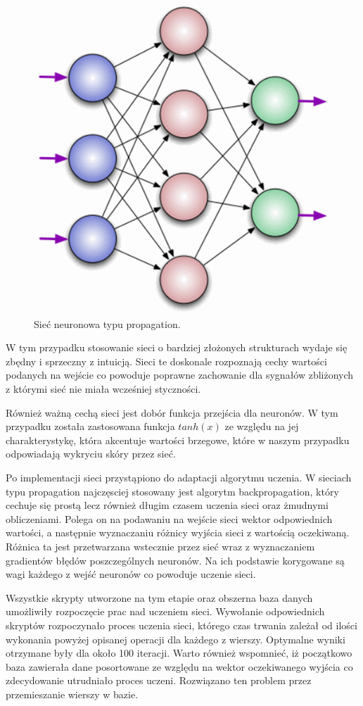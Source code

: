 \begin{figure}[tbph!]
	\centering
	\includegraphics[width=0.7\linewidth]{images/nn.png}
	\caption{Sieć neuronowa typu propagation.}
	\label{fig:nn}
\end{figure} 

W tym przypadku stosowanie sieci o bardziej złożonych strukturach wydaje się zbędny i sprzeczny z intuicją. Sieci te doskonale rozpoznają cechy wartości podanych na wejście co powoduje poprawne zachowanie dla sygnałów zbliżonych z którymi sieć nie miała wcześniej styczności. 

Również ważną cechą sieci jest dobór funkcja przejścia dla neuronów. W tym przypadku została zastosowana funkcja $tanh(x)$ ze względu na jej charakterystykę, która akcentuje wartości brzegowe, które w naszym przypadku odpowiadają wykryciu skóry przez sieć. 

Po implementacji sieci przystąpiono do adaptacji algorytmu uczenia. W sieciach typu propagation najczęsciej stosowany jest algorytm backpropagation, który cechuje się prostą lecz również długim czasem uczenia sieci oraz żmudnymi obliczeniami. Polega on na podawaniu na wejście sieci wektor odpowiednich wartości, a następnie wyznaczaniu różnicy wyjścia sieci z wartością oczekiwaną. Różnica ta jest przetwarzana wstecznie przez sieć wraz z wyznaczaniem gradientów błędów poszczególnych neuronów. Na ich podstawie korygowane są wagi każdego z wejść neuronów co powoduje uczenie sieci.

Wszystkie skrypty utworzone na tym etapie oraz obszerna baza danych umożliwiły rozpoczęcie prac nad uczeniem sieci. Wywołanie odpowiednich skryptów rozpoczynało proces uczenia sieci, którego czas trwania zależał od ilości wykonania powyżej opisanej operacji dla każdego z wierszy. Optymalne wyniki otrzymane były dla około 100 iteracji. Warto również wspomnieć, iż początkowo baza zawierała dane posortowane ze względu na wektor oczekiwanego wyjścia co zdecydowanie utrudniało proces uczeni. Rozwiązano ten problem przez przemieszanie wierszy w bazie.

